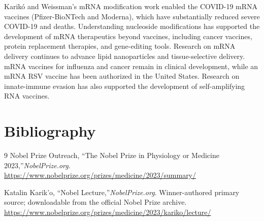 Karikó and Weissman's mRNA modification work enabled the COVID-19 mRNA vaccines (Pfizer-BioNTech and Moderna), which have substantially reduced severe COVID-19 and deaths. Understanding nucleoside modifications has supported the development of mRNA therapeutics beyond vaccines, including cancer vaccines, protein replacement therapies, and gene-editing tools. Research on mRNA delivery continues to advance lipid nanoparticles and tissue-selective delivery. mRNA vaccines for influenza and cancer remain in clinical development, while an mRNA RSV vaccine has been authorized in the United States. Research on innate-immune evasion has also supported the development of self-amplifying RNA vaccines.


\section{Bibliography}

\begin{thebibliography}{9}
Nobel Prize Outreach, ``The Nobel Prize in Physiology or Medicine 2023,''\emph{NobelPrize.org}.\\
\url{https://www.nobelprize.org/prizes/medicine/2023/summary/}

Katalin Karik'o, ``Nobel Lecture,''\emph{NobelPrize.org}. Winner-authored primary source; downloadable from the official Nobel Prize archive.\\
\url{https://www.nobelprize.org/prizes/medicine/2023/kariko/lecture/}
\end{thebibliography}
